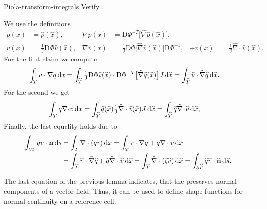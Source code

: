 \begin{Problem}{Piola-transform-integrals}
  Verify .
\begin{solution}
  We use the definitions
  \begin{align}
    p(x) &= \widehat p(\widehat x),&
    \nabla p(x) &= \mathrm D\Phi^{-T}
    \bigl[\widehat\nabla\widehat p(\widehat x)\bigr], \\
    v(x) &= \tfrac1{\mathrm J} \mathrm D\Phi \widehat v(\widehat x), &
    \nabla v(x) &= \tfrac1{\mathrm J} \mathrm D\Phi
    \bigl[\widehat\nabla \widehat v(\widehat x)\bigr] \mathrm D\Phi^{-1}, &
    \div v(x) &= \tfrac1{\mathrm J} \widehat\nabla \cdot
    \widehat v(\widehat x).
  \end{align}
For the first claim we compute
  \begin{align}
    \int_{T} v \cdot \nabla q \,\mathrm{d} x
    &= \int_{\widehat{T}}
       \tfrac1{\mathrm J} \mathrm D\Phi \widehat v(\widehat x) \cdot
       \mathrm D\Phi^{-T}\bigl[\widehat\nabla\widehat q(\widehat x)\bigr]
       J \,\mathrm{d} \widehat{x}
    = \int_{\widehat{T}} \widehat v \cdot \widehat \nabla \widehat q \,\mathrm{d} \widehat{x}.
  \end{align}
  For the second we get
  \begin{align}
    \int_{T} q \nabla\!\cdot\! v \,\mathrm{d} x
    &= \int_{\widehat{T}}
       \widehat q(\widehat x)
       \tfrac1{\mathrm J} \widehat\nabla \cdot \widehat v(\widehat x)
       J \,\mathrm{d} \widehat{x}
    = \int_{\widehat{T}} \widehat q \widehat \nabla\!\cdot\! \widehat v \,\mathrm{d} \widehat{x},
  \end{align}
  Finally, the last equality holds due to
  \begin{align}
    \int_{\partial T} q v\cdot\mathbf n \,\mathrm{d} s
    &= \int_{T} \nabla \cdot(q v) \,\mathrm{d} x
    = \int_{T} v\cdot \nabla q + q\nabla \cdot v \,\mathrm{d} x \\
    &= \int_{\widehat{T}} \widehat v\cdot \widehat \nabla \widehat q
                      + \widehat q \widehat \nabla \cdot \widehat v \,\mathrm{d} \widehat{x}
    = \int_{\widehat{T}}\widehat \nabla \cdot(\widehat q \widehat v) \,\mathrm{d} \widehat{x}
    = \int_{\partial\widehat{T}} \widehat q \widehat v\cdot\widehat {\mathbf n} \,\mathrm{d} \widehat{s}.
  \end{align}

\end{solution}
\end{Problem}

\begin{remark}
  The last equation of the previous lemma indicates, that the
   preserves normal components of a vector
  field. Thus, it can be used to define shape functions for normal
  continuity on a reference cell.
\end{remark}

